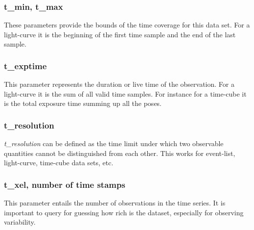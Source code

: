 \documentclass[11pt,a4paper]{ivoa}
\begin{document}
 \subsubsection{t\_min, t\_max}
 These parameters provide the bounds of the time coverage for this data set. For a light-curve it is the beginning of the first time sample and the end of the last sample.
  \subsubsection{t\_exptime}
  This parameter represents the duration or live time of the observation.
  For a light-curve it is the sum of all valid time samples. For instance for a time-cube it is the total exposure time summing up all the poses.
  \subsubsection{t\_resolution}
  \emph{t\_resolution} can be defined as the time limit under which two observable quantities cannot be distinguished from each other.
  This works for event-list, light-curve, time-cube data sets, etc.
  \subsubsection{t\_xel, number of time stamps}
This parameter entails the number of observations in the time series. It is important to query for guessing how rich is the dataset, especially for observing variability.


\end{document}

